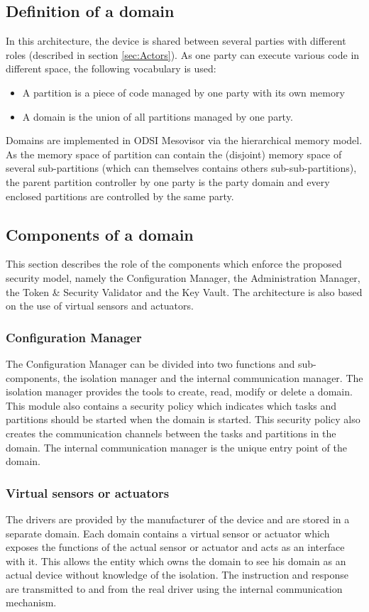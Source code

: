 \documentclass[conference]{IEEEtran}
\begin{document}
\subsection{Definition of a domain}
\label{sec:Domain_def}
In this architecture, the device is shared between several parties with different roles (described in section \ref{sec:Actors}). As one party can execute various code in different space, the following vocabulary is used:
\begin{itemize}
    \item A partition is a piece of code managed by one party with its own memory
    \item A domain is the union of all partitions managed by one party.
\end{itemize}
Domains are implemented in ODSI Mesovisor via the hierarchical memory model. As the memory space of partition can contain the (disjoint) memory space of several sub-partitions (which can themselves contains others sub-sub-partitions), the parent partition controller by one party is the party domain and every enclosed partitions are controlled by the same party.


\subsection{Components of a domain}
\label{sec:Domain_comp}
This section describes the role of the components which enforce the proposed security model, namely the Configuration Manager, the Administration Manager, the Token \& Security Validator and the Key Vault. The architecture is also based on the use of virtual sensors and actuators. 
\subsubsection{Configuration Manager}
\label{sec:Config_Mgr}
The Configuration Manager can be divided into two functions and sub-components, the isolation manager and the internal communication manager. The isolation manager provides the tools to create, read, modify or delete a domain. This module also contains a security policy which indicates which tasks and partitions should be started when the domain is started. This security policy also creates the communication channels between the tasks and partitions in the domain. The internal communication manager is the unique entry point of the domain. 

\subsubsection{Virtual sensors or actuators}
\label{sec:virtual_sensor}
The drivers are provided by the manufacturer of the device and are stored in a separate domain. Each domain contains a virtual sensor or actuator which exposes the functions of the actual sensor or actuator and acts as an interface with it. This allows the entity which owns the domain to see his domain as an actual device without knowledge of the isolation. The instruction and response are transmitted to and from the real driver using the internal communication mechanism.  
\end{document}
